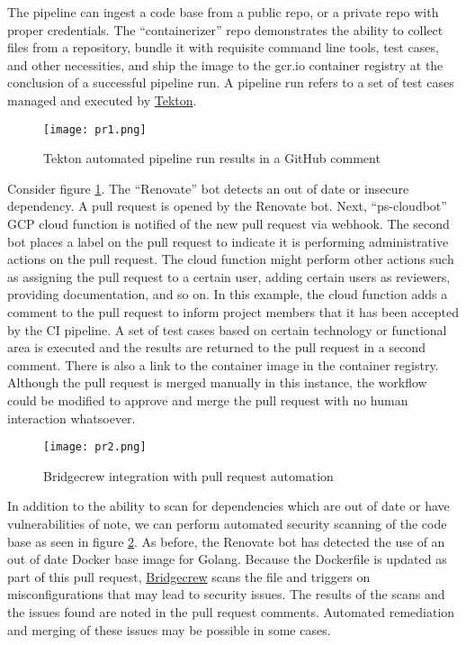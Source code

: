 The pipeline can ingest a code base from a public repo, or a private repo with proper credentials. The ``containerizer'' repo demonstrates the ability
to collect files from a repository, bundle it with requisite command line tools, test cases, and other necessities, and ship the image to the gcr.io container
registry at the conclusion of a successful pipeline run. A pipeline run refers to a set of test cases managed and executed by \href{https://tekton.dev/}{Tekton}.


\begin{figure}[H]
	\texttt{[image: pr1.png]}
	\caption{Tekton automated pipeline run results in a GitHub comment}
	\label{pr}
\end{figure}


Consider figure \ref{pr}. The ``Renovate'' bot detects an out of date or insecure dependency. A pull request is opened by the Renovate bot.
Next, ``ps-cloudbot'' GCP cloud function is notified of the new pull request via webhook. The second bot places a label on the pull request to indicate
it is performing administrative actions on the pull request. The cloud function might perform other actions such as assigning the pull request to a certain user,
adding certain users as reviewers, providing documentation, and so on. In this example, the cloud function adds a comment to the pull request to inform
project members that it has been accepted by the CI pipeline. A set of test cases based on certain technology or functional area is executed and the
results are returned to the pull request in a second comment. There is also a link to the container image in the container registry. Although the pull
request is merged manually in this instance, the workflow could be modified to approve and merge the pull request with no human interaction whatsoever.

\begin{figure}[H]
	\texttt{[image: pr2.png]}
	\caption{Bridgecrew integration with pull request automation}
	\label{pr2}
\end{figure}


In addition to the ability to scan for dependencies which are out of date or have vulnerabilities of note, we can perform automated security scanning
of the code base as seen in figure \ref{pr2}. As before, the Renovate bot has detected the use of an out of date Docker base image for Golang. Because
the Dockerfile is updated as part of this pull request, \href{https://docs.bridgecrew.io/docs}{Bridgecrew} scans the file and triggers on misconfigurations that may lead to security issues.
The results of the scans and the issues found are noted in the pull request comments. Automated remediation and merging of these issues may be possible in
some cases.



